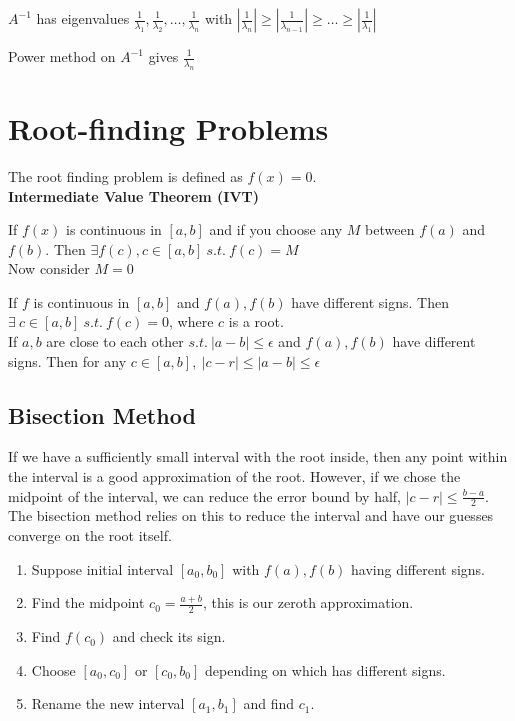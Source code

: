 \documentclass[12pt, letterpaper]{article}
\begin{document}
\noindent $A^{-1}$ has eigenvalues $\frac{1}{\lambda_1},\frac{1}{\lambda_2},\ldots,\frac{1}{\lambda_n}$ 
with $|\frac{1}{\lambda_n}|\ge|\frac{1}{\lambda_{n-1}}|\ge\ldots\ge|\frac{1}{\lambda_1}|$ 

\noindent Power method on $A^{-1}$ gives $\frac{1}{\lambda_n}$

\section{Root-finding Problems}

The root finding problem is defined as $f(x)=0$. \\

\noindent \textbf{Intermediate Value Theorem (IVT)}

If $f(x)$ is continuous in $[a,b]$ and if you choose any $M$ between $f(a)$ and $f(b)$. Then $\exists f(c), c\in [a,b]\ s.t.\ f(c)=M$ \\

\noindent Now consider $M=0$

If $f$ is continuous in $[a,b]$ and $f(a),f(b)$ have different signs.
Then $\exists\ c \in [a,b]\ s.t.\ f(c)=0$, where $c$ is a root. \\

If $a,b$ are close to each other $s.t.\ |a-b|\le \epsilon$ and $f(a),f(b)$ have different signs.
Then for any $c \in [a,b],\ |c-r|\le |a-b|\le \epsilon$

\subsection{Bisection Method}
If we have a sufficiently small interval with the root inside, then any point within the interval is a good approximation of the root. 
However, if we chose the midpoint of the interval, we can reduce the error bound by half, $|c-r|\le \frac{b-a}{2}$. 
The bisection method relies on this to reduce the interval and have our guesses converge on the root itself.

\begin{enumerate}
    \item Suppose initial interval $[a_0,b_0]$ with $f(a),f(b)$ having different signs.
    \item Find the midpoint $c_0=\frac{a+b}{2}$, this is our zeroth approximation.
    \item Find $f(c_0)$ and check its sign.
    \item Choose $[a_0,c_0]$ or $[c_0,b_0]$ depending on which has different signs.
    \item Rename the new interval $[a_1, b_1]$ and find $c_1$.
\end{enumerate}
\end{document}
